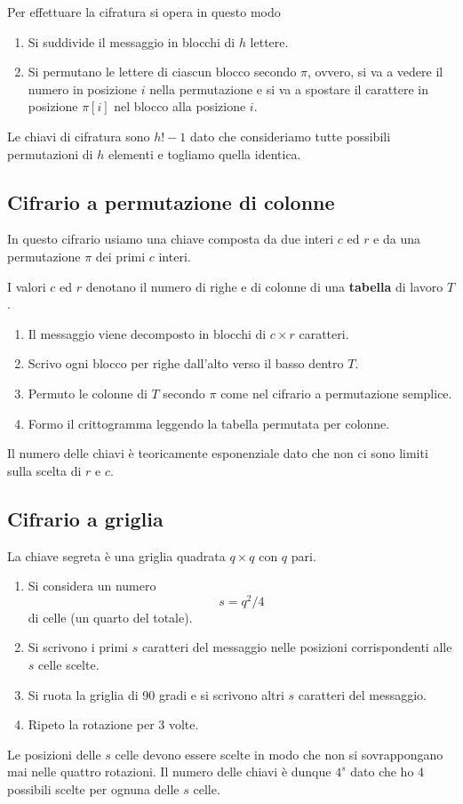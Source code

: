 Per effettuare la cifratura si opera in questo modo
\begin{enumerate}
	\item Si suddivide il messaggio in blocchi di $h$ lettere.
	\item Si permutano le lettere di ciascun blocco secondo $\pi$, ovvero, si va a vedere il numero in posizione $i$
	      nella permutazione e si va a spostare il carattere in posizione $\pi[i]$ nel blocco alla posizione $i$.
\end{enumerate}
Le chiavi di cifratura sono $h! - 1$ dato che consideriamo tutte possibili permutazioni di $h$ elementi e togliamo quella
identica.

\subsection{Cifrario a permutazione di colonne}
In questo cifrario usiamo una chiave composta da due interi $c$ ed $r$ e da una permutazione $\pi$ dei primi $c$ interi.

I valori $c$ ed $r$ denotano il numero di righe e di colonne di una \textbf{tabella} di lavoro $T$.

\begin{enumerate}
	\item Il messaggio viene decomposto in blocchi di $c \times r$ caratteri.
	\item Scrivo ogni blocco per righe dall'alto verso il basso dentro $T$.
	\item Permuto le colonne di $T$ secondo $\pi$ come nel cifrario a permutazione semplice.
	\item Formo il crittogramma leggendo la tabella permutata per colonne.
\end{enumerate}
Il numero delle chiavi \`e teoricamente esponenziale dato che non ci sono limiti sulla scelta di $r$ e $c$.

\subsection{Cifrario a griglia}
La chiave segreta \`e una griglia quadrata $q \times q$ con $q$ pari.
\begin{enumerate}
	\item Si considera un numero
	      \[ s = q^2 / 4 \]
	      di celle (un quarto del totale).
	\item Si scrivono i primi $s$ caratteri del messaggio nelle posizioni corrispondenti alle $s$ celle scelte.
	\item Si ruota la griglia di 90 gradi e si scrivono altri $s$ caratteri del messaggio.
	\item Ripeto la rotazione per 3 volte.
\end{enumerate}
Le posizioni delle $s$ celle devono essere scelte in modo che non si sovrappongano mai nelle quattro rotazioni. Il numero
delle chiavi \`e dunque $4^s$ dato che ho 4 possibili scelte per ognuna delle $s$ celle.